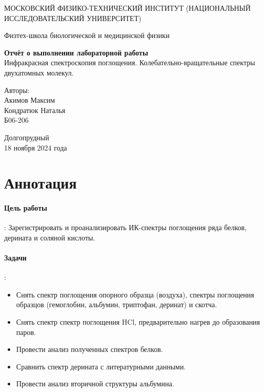 \documentclass{article}
\begin{document}
\begin{titlepage}
	\begin{center}
		{\large МОСКОВСКИЙ ФИЗИКО-ТЕХНИЧЕСКИЙ ИНСТИТУТ (НАЦИОНАЛЬНЫЙ ИССЛЕДОВАТЕЛЬСКИЙ УНИВЕРСИТЕТ)}
	\end{center}
	\begin{center}
		{\large Физтех-школа биологической и медицинской физики}
	\end{center}
	
	
	\vspace{4.5cm}
	{\huge
		\begin{center}
			{\bf Отчёт о выполнении лабораторной работы}\\
			Инфракрасная спектроскопия поглощения. Колебательно-вращательные спектры двухатомных молекул.
		\end{center}
	}
	\vspace{3cm}
	\begin{flushright}
		{\LARGE Авторы:\\ Акимов Максим \\ Кондратюк Наталья \\
			\vspace{0.5cm}
			Б06-206}
	\end{flushright}
	\vspace{3cm}
	\begin{center}
		Долгопрудный 
       \\18 ноября 2024 года
	\end{center}
 
\end{titlepage}

\newpage 
\section{Аннотация}
\paragraph*{Цель работы}: Зарегистрировать и проанализировать ИК-спектры поглощения ряда белков, дерината и соляной кислоты. 
\paragraph*{Задачи}:
\begin{itemize}
    \item Снять спектр поглощения опорного образца (воздуха), спектры поглощения образцов (гемоглобин, альбумин, триптофан, деринат) и скотча.
    \item Снять спектр спектр поглощения HCl, предварительно нагрев до образования паров.
    \item Провести анализ полученных спектров белков.
    \item Сравнить спектр дерината с литературными данными.
    \item Провести анализ вторичной структуры альбумина.
\end{itemize}
\end{document}
